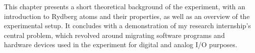 This chapter presents a short theoretical background of the experiment, with an introduction to Rydberg atoms and their properties, as well as an overview of the experimental setup. It concludes with a demonstration of my research internship's central problem, which revolved around migrating software programs and hardware devices used in the experiment for digital and analog I/O purposes.